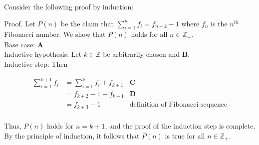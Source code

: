 \documentclass[solution,letterpaper]{cs20}
\begin{document}

    \begin{problem}
        Consider the following proof by induction:

        Proof. Let $P(n)$ be the claim that $\sum\limits_{i = 1}^{n} f_i = f_{n+2} - 1$ where $f_n$ is the $n^{th}$ Fibonacci number. We show that $P(n)$ holds for all $n \in \mathbb{Z}_+$. \\

        Base case: \textbf{A} \\

        Inductive hypothesis: Let $k \in \mathbb{Z}$ be arbitrarily chosen and \textbf{B}. \\

        Inductive step: Then

        \begin{align*}
            \sum\limits_{i = 1}^{k+1} f_i &= \sum\limits_{i = 1}^{k} f_i + f_{k+1} & \textbf{C} \\
            &= f_{k+2} - 1 + f_{k+1} & \textbf{D} \\
            &= f_{k+3} - 1 & \textrm{definition of Fibonacci sequence} \\
        \end{align*}

        Thus, $P(n)$ holds for $n = k + 1$, and the proof of the induction step is complete.
        By the principle of induction, it follows that $P(n)$ is true for all $n \in \mathbb{Z}_+$.


\end{problem}
\end{document}
